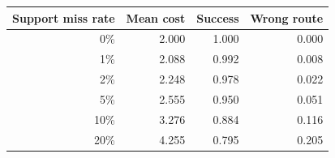 \begin{tabular}{rrrr}
\toprule
Support miss rate & Mean cost & Success & Wrong route \\
\midrule
0\% & 2.000 & 1.000 & 0.000 \\
1\% & 2.088 & 0.992 & 0.008 \\
2\% & 2.248 & 0.978 & 0.022 \\
5\% & 2.555 & 0.950 & 0.051 \\
10\% & 3.276 & 0.884 & 0.116 \\
20\% & 4.255 & 0.795 & 0.205 \\
\bottomrule
\end{tabular}
